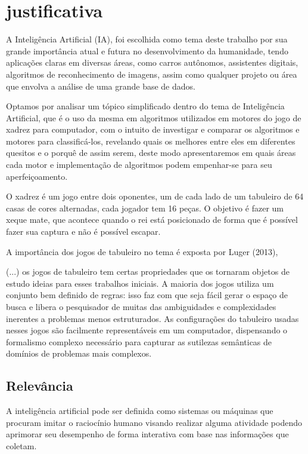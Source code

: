 \chapter{justificativa}

A Inteligência Artificial (IA), foi escolhida como tema deste trabalho por sua grande importância atual e futura no
desenvolvimento da humanidade, tendo aplicações claras em diversas áreas, como carros autônomos, assistentes digitais,
algoritmos de reconhecimento de imagens, assim como qualquer projeto ou área que envolva a análise de uma grande base de
dados.

Optamos por analisar um tópico simplificado dentro do tema de Inteligência Artificial, que é o uso da mesma em algoritmos
utilizados em motores do jogo de xadrez para computador, com o intuito de investigar e comparar os algoritmos e motores para
classificá-los, revelando quais os melhores entre eles em diferentes quesitos e o porquê de assim serem, deste modo
apresentaremos em quais áreas cada motor e implementação de algoritmos podem empenhar-se para seu aperfeiçoamento.

O xadrez é um jogo entre dois oponentes, um de cada lado de um tabuleiro de 64 casas de cores alternadas, cada jogador
tem 16 peças. O objetivo é fazer um xeque mate, que acontece quando o rei está posicionado de forma que é possível
fazer sua captura e não é possível escapar.

A importância dos jogos de tabuleiro no tema é exposta por Luger (2013),
\begin{citacao}
    (...) os jogos de tabuleiro tem certas propriedades que os tornaram objetos de estudo ideias para esses trabalhos iniciais.
    A maioria dos jogos utiliza um conjunto bem definido de regras: isso faz com que seja fácil gerar o espaço de busca e
    libera o pesquisador de muitas das ambiguidades e complexidades inerentes a problemas menos estruturados.
    As configurações do tabuleiro usadas nesses jogos são facilmente representáveis em um computador,
    dispensando o formalismo complexo necessário para capturar as sutilezas semânticas de domínios de problemas mais
    complexos. \cite[p.17]{luger}
\end{citacao}
\section{Relevância}
A inteligência artificial pode ser definida como sistemas ou máquinas que procuram imitar o raciocínio humano visando realizar
alguma atividade podendo aprimorar seu desempenho de forma interativa com base nas informações que coletam.


